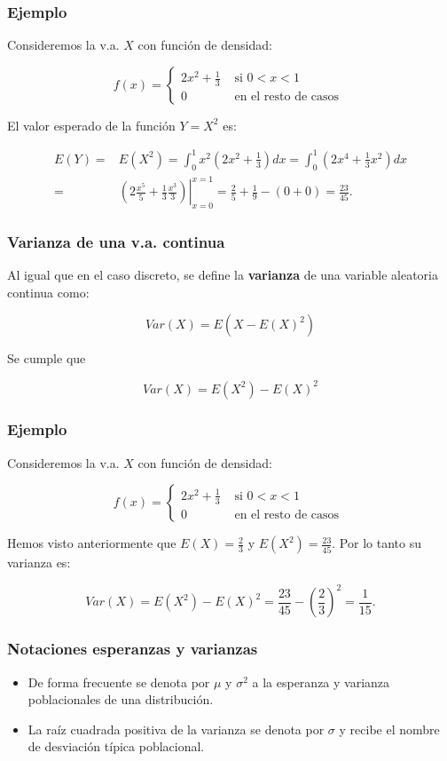 \begin{frame}
\frametitle{Ejemplo}
Consideremos la v.a. $X$  con función de densidad:

$$
f(x)=\left\{\begin{array}{ll} 2 x^2+\frac{1}{3} &\mbox{ si } 0 <x<1 \\
0 & \mbox{ en el resto de casos } 
 \end{array}\right.
$$


El valor esperado de la función $Y=X^2$ es:  

\[
\begin{array}{rl}
E(Y)= & E(X^2)=\int_{0}^1 x^2 \left(2 x^2 +\frac{1}{3}\right) dx= \int_{0}^1 \left(2 x^4 +\frac{1}{3}x^2\right) dx \\ = & 
\left.\left(2 \frac{x^5}{5}+\frac{1}{3} \frac{x^3}{3}\right)\right|_{x=0}^{x=1}=\frac{2}{5}+\frac{1}{9}-(0+0)=\frac{23}{45}.
\end{array}
\]

\end{frame}


\begin{frame}
\frametitle{Varianza de una v.a. continua}

Al igual que en el caso discreto, se define la \textbf{varianza} de una variable aleatoria continua como:

$$Var(X)=E(X-E(X)^2)$$

Se cumple que 

$$Var(X)=E(X^2)-E(X)^2$$

\end{frame}

\begin{frame}
\frametitle{Ejemplo}
Consideremos la v.a. $X$  con función de densidad:

$$
f(x)=\left\{\begin{array}{ll} 2 x^2+\frac{1}{3} &\mbox{ si } 0 <x<1 \\
0 & \mbox{ en el resto de casos } 
 \end{array}\right.
$$

Hemos visto anteriormente que $E(X)=\frac{2}{3}$ y $E(X^2)=\frac{23}{45}$. Por lo tanto su varianza es:

\[
Var(X)=E(X^2)-E(X)^2= \frac{23}{45}-\left(\frac{2}{3}\right)^2=\frac{1}{15}.
\]
\end{frame}


\begin{frame}
 \frametitle{Notaciones esperanzas y varianzas}
\begin{itemize}
\item De forma frecuente se denota por $\mu$ y $\sigma^2$ a la esperanza y varianza poblacionales de una distribución.
\item  La raíz cuadrada positiva de la varianza se denota por $\sigma$ y recibe el nombre de desviación típica poblacional.
\end{itemize}
\end{frame}

